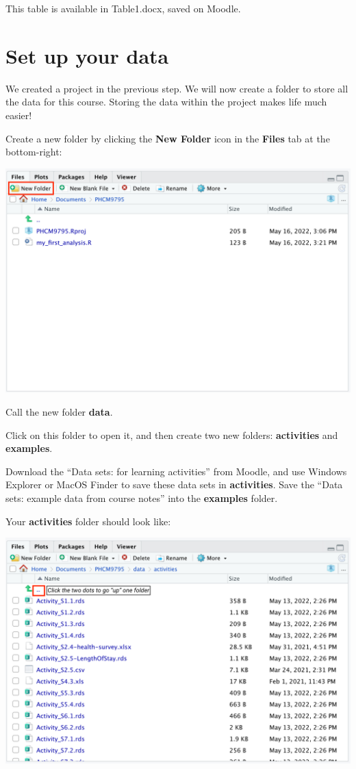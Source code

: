 \documentclass[
]{memoir}
\begin{document}
This table is available in Table1.docx, saved on Moodle.

\hypertarget{set-up-your-data}{%
\section{Set up your data}\label{set-up-your-data}}

We created a project in the previous step. We will now create a folder to store all the data for this course. Storing the data within the project makes life much easier!

Create a new folder by clicking the \textbf{New Folder} icon in the \textbf{Files} tab at the bottom-right:

\includegraphics[width=0.75\linewidth]{img/NewFolder-1}

Call the new folder \textbf{data}.

Click on this folder to open it, and then create two new folders: \textbf{activities} and \textbf{examples}.

Download the ``Data sets: for learning activities'' from Moodle, and use Windows Explorer or MacOS Finder to save these data sets in \textbf{activities}. Save the ``Data sets: example data from course notes'' into the \textbf{examples} folder.

Your \textbf{activities} folder should look like:

\includegraphics[width=0.75\linewidth]{img/data-folder}
\end{document}
